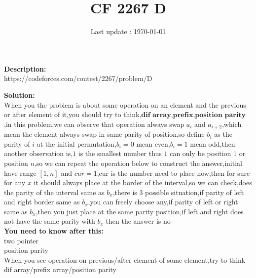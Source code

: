 \documentclass{article}
\begin{document}
\title{\textbf{CF 2267 D}}
\author{}
\date{Last update : \today}

\maketitle

\noindent \textbf{Description:}\\
https://codeforces.com/contest/2267/problem/D

\noindent \textbf{Solution:}\\
When you the problem is about some operation on an element and the previous or after element of it,you should try to think,$\textbf{dif array,prefix,position parity}$,in this problem,we can observe that operation always swap $a_i$ and $a_{i+2}$,which mean the element always swap in same parity of position,so define $b_i$ as the parity of $i$ at the initial permutation,$b_i=0$ mean even,$b_i=1$ mean odd,then another observation is,$1$ is the smallest number thus $1$ can only be position $1$ or position $n$,so we can repeat the operation below to construct the answer,initial have range $[1,n]$ and $cur=1$,cur is the number need to place now,then for sure for any $x$ it should always place at the border of the interval,so we can check,does the parity of the interval same as $b_x$,there is $3$ possible situation,if parity of left and right border same as $b_x$,you can freely choose any,if parity of left or right same as $b_x$,then you just place at the same parity position,if left and right does not have the same parity with $b_x$ then the answer is no
\\
\noindent \textbf{You need to know after this:}\\
two pointer\\
position parity\\
When you see operation on previous/after element of some element,try to think dif array/prefix array/position parity
\end{document}
